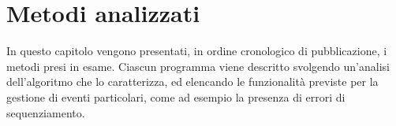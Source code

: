 \documentclass[crop=false, class=book]{standalone}
\begin{document}
	\chapter{Metodi analizzati}
	In questo capitolo vengono presentati, in ordine cronologico di pubblicazione, i metodi presi in esame. Ciascun programma viene descritto svolgendo un'analisi dell'algoritmo che lo caratterizza, ed elencando le funzionalità previste per la gestione di eventi particolari, come ad esempio la presenza di errori di sequenziamento. 
	
\end{document}
